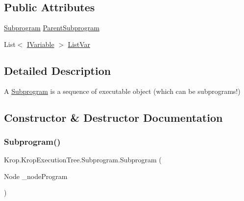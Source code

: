 \subsection*{Public Attributes}
\begin{DoxyCompactItemize}
\item 
\mbox{\hyperlink{class_krop_1_1_krop_execution_tree_1_1_subprogram}{Subprogram}} \mbox{\hyperlink{class_krop_1_1_krop_execution_tree_1_1_subprogram_a8c7a1466aa0fa810acf3608419dae5d7}{Parent\+Subprogram}}
\item 
List$<$ \mbox{\hyperlink{interface_krop_1_1_krop_execution_tree_1_1_interface_1_1_i_variable}{I\+Variable}} $>$ \mbox{\hyperlink{class_krop_1_1_krop_execution_tree_1_1_subprogram_a22b8af148b8bf0bef634a3efb1290a94}{List\+Var}}
\end{DoxyCompactItemize}


\subsection{Detailed Description}
A \mbox{\hyperlink{class_krop_1_1_krop_execution_tree_1_1_subprogram}{Subprogram}} is a sequence of executable object (which can be subprograms!) 



\subsection{Constructor \& Destructor Documentation}
\mbox{\label{class_krop_1_1_krop_execution_tree_1_1_subprogram_a200f90697de001a2fc317cd185db6b6b}} 
\subsubsection{\texorpdfstring{Subprogram()}{Subprogram()}\hspace{0.1cm}{\footnotesize\ttfamily [1/2]}}
{\footnotesize\ttfamily Krop.\+Krop\+Execution\+Tree.\+Subprogram.\+Subprogram (\begin{DoxyParamCaption}\item[{Node}]{\+\_\+node\+Program }\end{DoxyParamCaption})}

